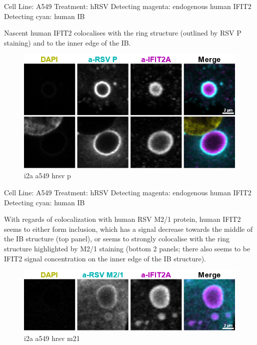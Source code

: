 Cell Line: A549 \newline
Treatment: hRSV \newline
Detecting magenta: endogenous human IFIT2  \newline
Detecting cyan: human IB \newline

Nascent human IFIT2 colocalises with the ring structure (outlined by RSV P staining) and to the inner edge of the IB.

\begin{figure}
    \centering
    \includegraphics[width=1\linewidth]{09. Chapter 4//Figs//01. I2A/05. i2a a549 hrsv p.png}
    \caption[i2a a549 hrsv p]{i2a a549 hrsv p}
    \label{i2a a549 hrsv p}
\end{figure}

Cell Line: A549 \newline
Treatment: hRSV \newline
Detecting magenta: endogenous human IFIT2  \newline
Detecting cyan: human IB \newline

With regards of colocalization with human RSV M2/1 protein, human IFIT2 seems to either form inclusion, which has a signal decrease towards the middle of the IB structure (top panel), or seems to strongly colocalise with the ring structure highlighted by M2/1 staining (bottom 2 panels; there also seems to be IFIT2 signal concentration on the inner edge of the IB structure).

\begin{figure}
    \centering
    \includegraphics[width=1\linewidth]{09. Chapter 4//Figs//01. I2A/06. i2a a549 hrsv m21.png}
    \caption[i2a a549 hrsv m21]{i2a a549 hrsv m21}
    \label{i2a a549 hrsv m21}
\end{figure}

